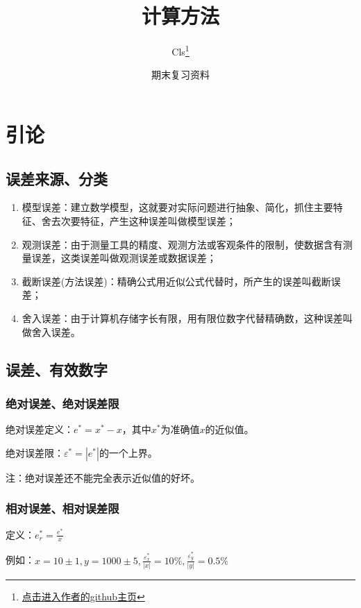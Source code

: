 \documentclass[UTF8,a4paper,11pt,oneside]{ctexbook}
\title{计算方法}
\author{Cls\thanks{\href{https://github.com/Clignniis}{点击进入作者的github主页}}}
\date{期末复习资料}
\begin{document}
\frontmatter

\maketitle

\tableofcontents

\mainmatter

\chapter{引论}

\section{误差来源、分类}
\begin{enumerate}
    \item 模型误差：建立数学模型，这就要对实际问题进行抽象、简化，抓住主要特征、舍去次要特征，产生这种误差叫做模型误差；
    \item 观测误差：由于测量工具的精度、观测方法或客观条件的限制，使数据含有测量误差，这类误差叫做观测误差或数据误差；
    \item 截断误差(方法误差)：精确公式用近似公式代替时，所产生的误差叫截断误差；
    \item 舍入误差：由于计算机存储字长有限，用有限位数字代替精确数，这种误差叫做舍入误差。
\end{enumerate}

\section{误差、有效数字}

\subsection{绝对误差、绝对误差限}

绝对误差定义：\(e^*=x^*-x\)，其中\(x^*\)为准确值\(x\)的近似值。

绝对误差限：\(\varepsilon^*=|e^*|\)的一个上界。

注：绝对误差还不能完全表示近似值的好坏。

\subsection{相对误差、相对误差限}

定义：\(e_r^*=\frac{e^*}{x}\)

例如：\(x=10\pm1,y=1000±5,\frac{\varepsilon_x^*}{|x|}=10\%,\frac{\varepsilon_y^*}{|y|}=0.5\%\)
\end{document}
